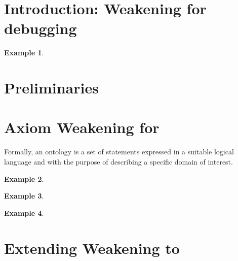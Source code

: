 \documentclass[
]{ceurart}
\newtheorem{example}{Example}
\begin{document}
\section{Introduction: Weakening for debugging}


\begin{example}
\end{example}


\section{Preliminaries}

\section{Axiom Weakening for \ALC}

Formally, an ontology is a set of statements expressed in a suitable logical language and with the purpose of describing a specific domain of interest. 



\begin{example}
\end{example}


\begin{example}
\end{example}


\begin{example}
\end{example}

\section{Extending Weakening to \SROIQ}
\end{document}
